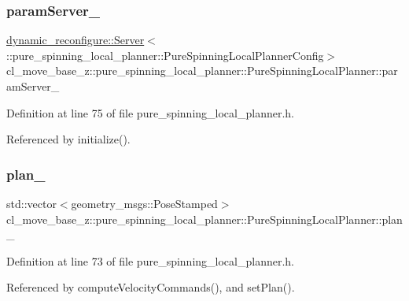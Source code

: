 \subsubsection{\texorpdfstring{param\+Server\+\_\+}{paramServer\_}}
{\footnotesize\ttfamily \hyperlink{sm__ridgeback__floor__coverage__static__1_2servers_2led__action__server_2src_2led__action__server__node_8cpp_a280552a59985eb5d9311dba701679363}{dynamic\+\_\+reconfigure\+::\+Server}$<$\+::pure\+\_\+spinning\+\_\+local\+\_\+planner\+::\+Pure\+Spinning\+Local\+Planner\+Config$>$ cl\+\_\+move\+\_\+base\+\_\+z\+::pure\+\_\+spinning\+\_\+local\+\_\+planner\+::\+Pure\+Spinning\+Local\+Planner\+::param\+Server\+\_\+\hspace{0.3cm}{\ttfamily [private]}}



Definition at line 75 of file pure\+\_\+spinning\+\_\+local\+\_\+planner.\+h.



Referenced by initialize().

\mbox{\label{classcl__move__base__z_1_1pure__spinning__local__planner_1_1PureSpinningLocalPlanner_a31875ee78bae4698b579e20c0754860d}} 
\subsubsection{\texorpdfstring{plan\+\_\+}{plan\_}}
{\footnotesize\ttfamily std\+::vector$<$geometry\+\_\+msgs\+::\+Pose\+Stamped$>$ cl\+\_\+move\+\_\+base\+\_\+z\+::pure\+\_\+spinning\+\_\+local\+\_\+planner\+::\+Pure\+Spinning\+Local\+Planner\+::plan\+\_\+\hspace{0.3cm}{\ttfamily [private]}}



Definition at line 73 of file pure\+\_\+spinning\+\_\+local\+\_\+planner.\+h.



Referenced by compute\+Velocity\+Commands(), and set\+Plan().


